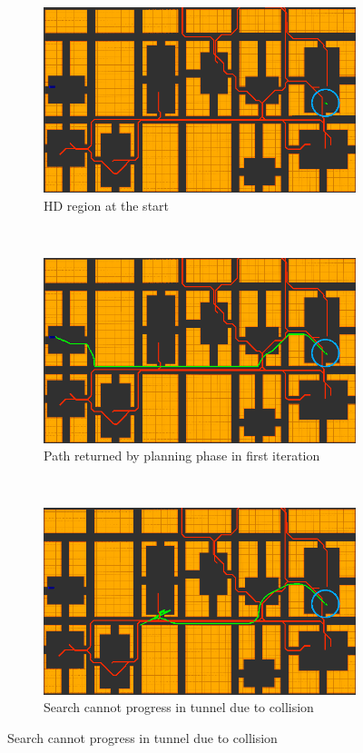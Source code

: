 \begin{figure}[ht]
  \centering
  \begin{subfigure}[t]{0.3\linewidth}
    \centering
    \includegraphics[width=\linewidth]{Figures/alg1_c.png}
    \caption{HD region at the start}
  \end{subfigure}
  ~
  \begin{subfigure}[t]{0.3\linewidth}
    \centering
    \includegraphics[width=\linewidth]{Figures/alg2_c.png}
    \caption{Path returned by planning phase in first iteration}
  \end{subfigure}
  ~
  \begin{subfigure}[t]{0.3\linewidth}
    \centering
    \includegraphics[width=\linewidth]{Figures/alg3_c.png}
    \caption{Search cannot progress in tunnel due to collision}
  \end{subfigure}
  

\end{figure}
